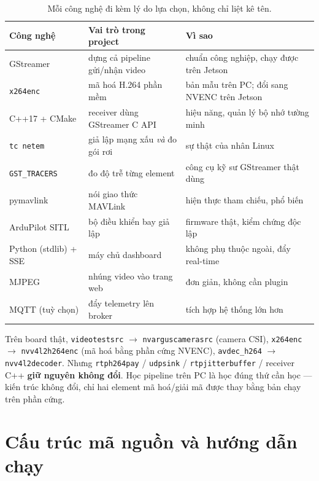 \documentclass[12pt]{ai_conquer2026}
\begin{document}
\begin{table}[h]
\centering
\small
\begin{tabularx}{\linewidth}{@{}l >{\raggedright\arraybackslash}X >{\raggedright\arraybackslash}X@{}}
\toprule
Công nghệ & Vai trò trong project & Vì sao \\
\midrule
GStreamer & dựng cả pipeline gửi/nhận video & chuẩn công nghiệp, chạy được trên Jetson \\
\texttt{x264enc} & mã hoá H.264 phần mềm & bản mẫu trên PC; đổi sang NVENC trên Jetson \\
C++17 + CMake & receiver dùng GStreamer C API & hiệu năng, quản lý bộ nhớ tường minh \\
\texttt{tc netem} & giả lập mạng xấu \emph{và} đo gói rơi & sự thật của nhân Linux \\
\texttt{GST\_TRACERS} & đo độ trễ từng element & công cụ kỹ sư GStreamer thật dùng \\
pymavlink & nói giao thức MAVLink & hiện thực tham chiếu, phổ biến \\
ArduPilot SITL & bộ điều khiển bay giả lập & firmware thật, kiểm chứng độc lập \\
Python (stdlib) + SSE & máy chủ dashboard & không phụ thuộc ngoài, đẩy real-time \\
MJPEG & nhúng video vào trang web & đơn giản, không cần plugin \\
MQTT (tuỳ chọn) & đẩy telemetry lên broker & tích hợp hệ thống lớn hơn \\
\bottomrule
\end{tabularx}
\caption{Mỗi công nghệ đi kèm lý do lựa chọn, không chỉ liệt kê tên.}
\end{table}

\begin{aivncodebox}
Trên board thật, \texttt{videotestsrc} $\to$ \texttt{nvarguscamerasrc} (camera
CSI), \texttt{x264enc} $\to$ \texttt{nvv4l2h264enc} (mã hoá bằng phần cứng NVENC),
\texttt{avdec\_h264} $\to$ \texttt{nvv4l2decoder}. Nhưng \texttt{rtph264pay} /
\texttt{udpsink} / \texttt{rtpjitterbuffer} / receiver C++ \textbf{giữ nguyên
không đổi}. Học pipeline trên PC là học đúng thứ cần học --- kiến trúc không đổi,
chỉ hai element mã hoá/giải mã được thay bằng bản chạy trên phần cứng.
\end{aivncodebox}

\section{Cấu trúc mã nguồn và hướng dẫn chạy}
\end{document}
